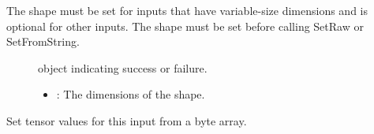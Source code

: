 \documentclass[letterpaper,10pt,english]{sphinxmanual}
\begin{document}
\begin{fulllineitems}
\begin{fulllineitems}
The shape must be set for inputs that have variable-size dimensions and is optional for other inputs. The shape must be set before calling SetRaw or SetFromString. \begin{description}
\item[{}] \leavevmode
{\hyperref[\detokenize{cpp_api/classnvidia_1_1inferenceserver_1_1client_1_1Error:classnvidia_1_1inferenceserver_1_1client_1_1Error}]{}} object indicating success or failure. 

\item[{}] \leavevmode\begin{itemize}
\item {} 
: The dimensions of the shape. 

\end{itemize}

\end{description}


\end{fulllineitems}


\begin{fulllineitems}
\label{\detokenize{cpp_api/classnvidia_1_1inferenceserver_1_1client_1_1InferContext_1_1Input:_CPPv4N6nvidia15inferenceserver6client12InferContext5Input6SetRawEPK7uint8_t6size_t}}%
\pysigstartmultiline
{}\label{\detokenize{cpp_api/classnvidia_1_1inferenceserver_1_1client_1_1InferContext_1_1Input:classnvidia_1_1inferenceserver_1_1client_1_1InferContext_1_1Input_1a414fe9afbb60a48f162bac5439beee4d}}%
\pysigstopmultiline
Set tensor values for this input from a byte array. 


\end{fulllineitems}
\end{fulllineitems}
\end{document}
